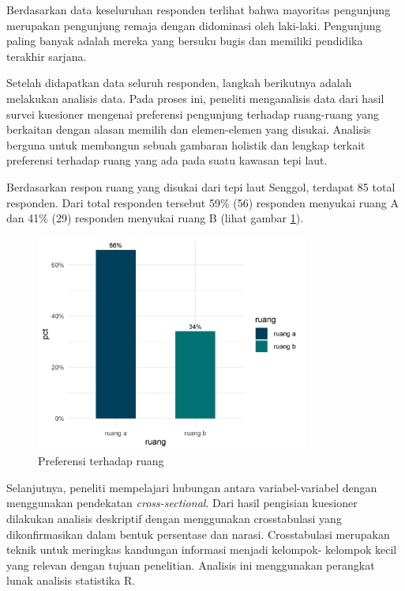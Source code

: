 \documentclass[11pt]{simart} %
\begin{document}
Berdasarkan data keseluruhan responden terlihat bahwa mayoritas pengunjung merupakan pengunjung remaja dengan didominasi oleh laki-laki. Pengunjung paling banyak adalah mereka yang bersuku bugis dan memiliki pendidika terakhir sarjana.

Setelah didapatkan data seluruh responden, langkah berikutnya adalah melakukan analisis data.
Pada proses ini, peneliti menganalisis data dari hasil survei kuesioner mengenai preferensi pengunjung terhadap ruang-ruang yang berkaitan dengan alasan memilih dan elemen-elemen yang disukai.
Analisis berguna untuk membangun sebuah gambaran holistik dan lengkap terkait preferensi terhadap ruang yang ada pada suatu kawasan tepi laut.

Berdasarkan respon ruang yang disukai dari tepi laut Senggol, terdapat 85 total responden. Dari total responden tersebut 59\% (56) responden menyukai ruang A dan 41\% (29) responden menyukai ruang B (lihat gambar \ref{fig:pctruang}).

\begin{figure}[htpb]
    \centering
    \includegraphics[width=0.8\textwidth]{figures/pctruang}
    \caption{Preferensi terhadap ruang}
    \label{fig:pctruang}
\end{figure}

Selanjutnya, peneliti mempelajari hubungan antara variabel-variabel dengan menggunakan pendekatan \textit{cross-sectional}. Dari hasil pengisian kuesioner dilakukan analisis deskriptif dengan menggunakan crosstabulasi yang dikonfirmasikan dalam bentuk persentase dan narasi.
Crosstabulasi merupakan teknik untuk meringkas kandungan informasi menjadi kelompok- kelompok kecil yang relevan dengan tujuan penelitian. Analisis ini menggunakan perangkat lunak analisis statistika R.
\end{document}
